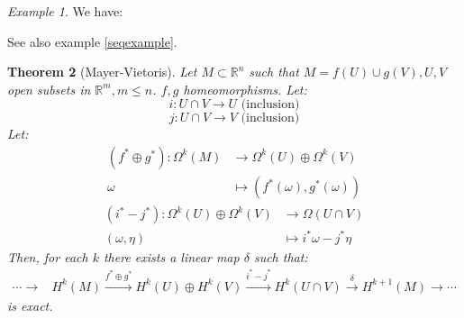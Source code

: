 \documentclass[a4paper,11pt,titlepage, article, oneside]{memoir}
\numberwithin{equation}{section}
\newtheorem{theorem}{Theorem}[section]
\theoremstyle{definition}
\theoremstyle{remark}
\newtheorem{example}[theorem]{Example}
\newcommand{\rfield}{\mathbb{R}}
\begin{document}
\begin{tcolorbox}\begin{example}
  We have:
    \begin{center}
\end{center}
See also example \ref{seqexample}.
\end{example}\end{tcolorbox}

\begin{theorem}[Mayer-Vietoris] \label{mvthm}
  Let $M \subset \rfield^n$ such that $M=f(U) \cup g(V), U, V$ open subsets in $\rfield^m, m \le n$. $f, g$ homeomorphisms.
  Let:
  $$i \colon U \cap V \rightarrow U \text{ (inclusion)}$$
  $$j \colon U \cap V \rightarrow V \text{ (inclusion)}$$
  Let:
  \begin{align*}
    (f^* \oplus g^*) \colon \Omega^k(M) &\rightarrow \Omega^k(U) \oplus \Omega^k(V) \\
    \omega &\mapsto (f^*(\omega), g^*(\omega))
  \end{align*}
  \begin{align*}
    (i^* - j^*) \colon \Omega^k(U) \oplus \Omega^k(V) &\rightarrow \Omega(U \cap V)\\
    (\omega, \eta) &\mapsto i^* \omega - j^* \eta
  \end{align*}
  Then, for each $k$ there exists a linear map $\delta$ such that:
  \begin{align*}
    \cdots \longrightarrow &H^k(M) \overset{f^* \oplus g^*}{\longrightarrow} H^k(U) \oplus H^k(V) \overset{i^* - j^*}{\longrightarrow} H^k(U \cap V) \overset{\delta}{\longrightarrow} H^{k+1}(M) \longrightarrow \cdots
  \end{align*}
  is exact.
\end{theorem}
\end{document}
